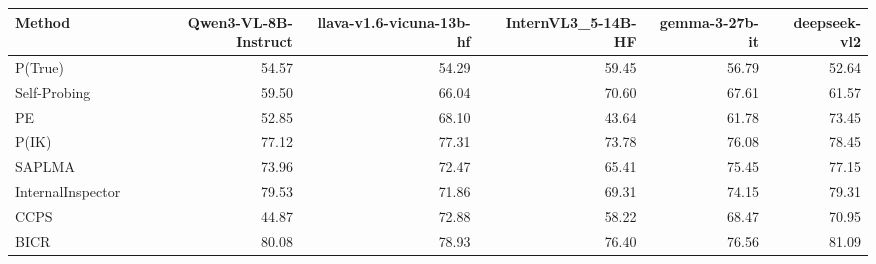 \begin{tabular}{lrrrrr}
\toprule
Method & Qwen3-VL-8B-Instruct & llava-v1.6-vicuna-13b-hf & InternVL3_5-14B-HF & gemma-3-27b-it & deepseek-vl2 \\
\midrule
P(True) & 54.57 & 54.29 & 59.45 & 56.79 & 52.64 \\
Self-Probing & 59.50 & 66.04 & 70.60 & 67.61 & 61.57 \\
PE & 52.85 & 68.10 & 43.64 & 61.78 & 73.45 \\
P(IK) & 77.12 & 77.31 & 73.78 & 76.08 & 78.45 \\
SAPLMA & 73.96 & 72.47 & 65.41 & 75.45 & 77.15 \\
InternalInspector & 79.53 & 71.86 & 69.31 & 74.15 & 79.31 \\
CCPS & 44.87 & 72.88 & 58.22 & 68.47 & 70.95 \\
BICR & 80.08 & 78.93 & 76.40 & 76.56 & 81.09 \\
\bottomrule
\end{tabular}
